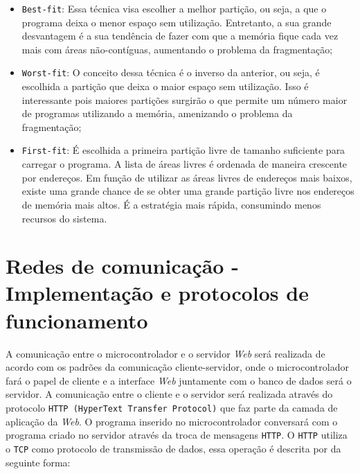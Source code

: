 \begin{itemize}

	\item \texttt{Best-fit}:
Essa técnica visa escolher a melhor partição, ou seja, a que o programa deixa o menor espaço sem utilização. Entretanto, a sua grande desvantagem é a sua tendência de fazer com que a memória fique cada vez mais com áreas não-contíguas, aumentando o problema da fragmentação;
	\item \texttt{Worst-fit}:
O conceito dessa técnica é o inverso da anterior, ou seja, é escolhida a partição que deixa o maior espaço sem utilização. Isso é interessante pois maiores partições surgirão o que permite um número maior de programas utilizando a memória, amenizando o problema da fragmentação;
	\item \texttt{First-fit}:
É escolhida a primeira partição livre de tamanho suficiente para carregar o programa. A lista de áreas livres é ordenada de maneira crescente por endereços. Em função de utilizar as áreas livres de endereços mais baixos, existe uma grande chance de se obter uma grande partição livre nos endereços de memória mais altos. É a estratégia mais rápida, consumindo menos recursos do sistema.

\end{itemize}

\section{Redes de comunicação - Implementação e protocolos de funcionamento} 

A comunicação entre o microcontrolador e o servidor \textit{Web} será realizada de acordo 
com os padrões da comunicação cliente-servidor, onde o microcontrolador fará o papel 
de cliente e a interface \textit{Web} juntamente com o banco de dados será o servidor. A comunicação 
entre o cliente e o servidor será realizada através do protocolo \texttt{HTTP (HyperText Transfer Protocol)} 
que faz parte da camada de aplicação da \textit{Web}. O programa inserido no microcontrolador conversará com 
o programa criado no servidor através da troca de mensagens \texttt{HTTP}.
O \texttt{HTTP} utiliza o \texttt{TCP} como protocolo de transmissão de dados, essa operação é
descrita por \cite[p.~73]{kurose2010} da seguinte forma:

